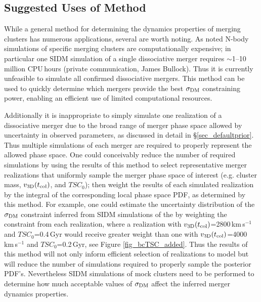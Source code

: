 \documentclass[12pt]{emulateapj}
\begin{document}
\subsection{Suggested Uses of Method}\label{sec_suggestions}

While a general method for determining the dynamics properties of merging clusters has numerous applications, several are worth noting.
As noted N-body simulations of specific merging clusters are computationally expensive; in particular one SIDM simulation of a single dissociative merger requires $\sim$1--10 million CPU\,hours (private communication, James Bullock). 
Thus it is currently unfeasible to simulate all confirmed dissociative mergers.
This method can be used to quickly determine which mergers provide the best $\sigma_{\rm DM}$ constraining power, enabling an efficient use of limited computational resources.

Additionally it is inappropriate to simply simulate one realization of a dissociative merger due to the broad range of merger phase space allowed by uncertainty in observed parameters, as discussed in detail in \S\ref{sec_defaultprior}.
Thus multiple simulations of each merger are required to properly represent the allowed phase space.
One could conceivably reduce the number of required simulations by using the results of this method to select representative merger realizations that uniformly sample the merger phase space of interest (e.g. cluster mass, $v_{\rm 3D}(t_{\rm col})$, and $TSC_0$);
then weight the results of each simulated realization by the integral of the corresponding local phase space PDF, as determined by this method.
For example, one could estimate the uncertainty distribution of the $\sigma_{\rm DM}$ constraint inferred from SIDM simulations of the  by weighting the constraint from each realization, where a realization with  $v_{\rm 3D}(t_{\rm col})$=2800\,km\,s$^{-1}$ and $TSC_0$=0.4\,Gyr would receive greater weight than one with $v_{\rm 3D}(t_{\rm col})$=4000\,km\,s$^{-1}$ and $TSC_0$=0.2\,Gyr, see Figure \ref{fig_bcTSC_added}.
Thus the results of this method will not only inform efficient selection of realizations to model but will reduce the number of simulations required to properly sample the posterior PDF's.
Nevertheless SIDM simulations of mock clusters need to be performed to determine how much acceptable values of $\sigma_{\rm DM}$ affect the inferred merger dynamics properties.
\end{document}
